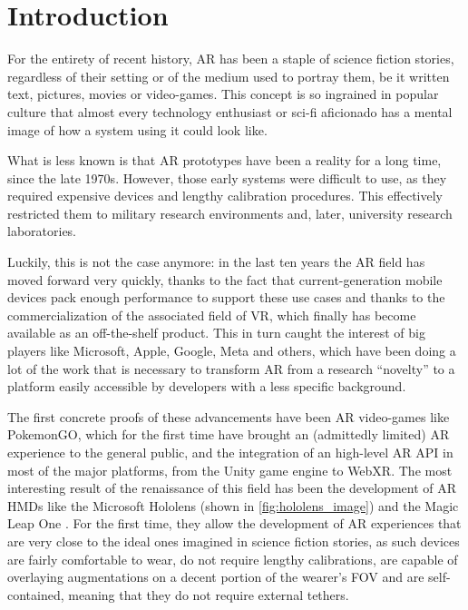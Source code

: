 
\chapter{Introduction}\label{chapter:introduction}

For the entirety of recent history, \acrlong{AR} has been a staple of science fiction stories, regardless of their setting or of the medium used to portray them, be it written text, pictures, movies or video-games. This concept is so ingrained in popular culture that almost every technology enthusiast or sci-fi aficionado has a mental image of how a system using it could look like.

What is less known is that \acrlong{AR} prototypes have been a reality for a long time, since the late 1970s\cite{kocian_visually-coupled_1977}. However, those early systems were difficult to use, as they required expensive devices and lengthy calibration procedures. This effectively restricted them to military research environments and, later, university research laboratories.

Luckily, this is not the case anymore: in the last ten years the \gls{AR} field has moved forward very quickly, thanks to the fact that current-generation mobile devices pack enough performance to support these use cases and thanks to the commercialization of the associated field of \gls{VR}, which finally has become available as an off-the-shelf product. This in turn caught the interest of big players like Microsoft, Apple, Google, Meta and others, which have been doing a lot of the work that is necessary to transform \gls{AR} from a research \enquote{novelty} to a platform easily accessible by developers with a less specific background\cite{google_llc_arcore_nodate, apple_inc_arkit_nodate, microsoft_corporation_microsoft_nodate, meta_platforms_inc_spark_nodate}.

The first concrete proofs of these advancements have been \gls{AR} video-games like PokemonGO\cite{niantic_inc_pokemon_nodate}, which for the first time have brought an (admittedly limited) \acrlong{AR} experience to the general public, and the integration of an high-level \gls{AR} \gls{API} in most of the major platforms, from the Unity game engine\cite{unity_technologies_unity_nodate} to WebXR\cite{world_wide_web_consortium_webxr_nodate}. The most interesting result of the renaissance of this field has been the development of \gls{AR} \glspl{HMD} like the Microsoft Hololens\cite{microsoft_corporation_microsoft_nodate} (shown in \autoref{fig:hololens_image}) and the Magic Leap One \cite{magic_leap_inc_magic_nodate}. For the first time, they allow the development of \gls{AR} experiences that are very close to the ideal ones imagined in science fiction stories, as such devices are fairly comfortable to wear, do not require lengthy calibrations, are capable of overlaying augmentations on a decent portion of the wearer's \gls{FOV} and are self-contained, meaning that they do not require external tethers.

